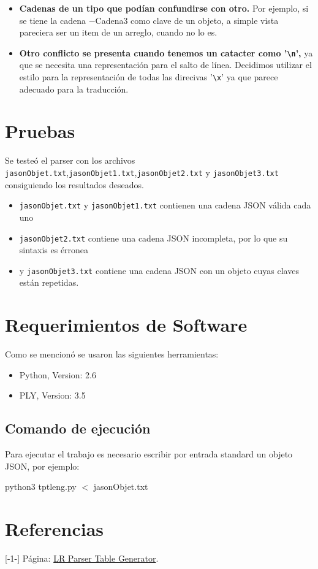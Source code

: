 \documentclass{article}
\begin{document}
\begin{itemize}
	\item \textbf{Cadenas de un tipo que podían confundirse con otro.} Por ejemplo, si se tiene la cadena $-$Cadena3 como clave de un objeto, a simple vista pareciera ser un item de un arreglo, cuando no lo es.
	\item \textbf{Otro conflicto se presenta cuando tenemos un catacter como '\texttt{\textbackslash n}',} ya que se necesita una representación para el salto de línea. Decidimos utilizar el estilo para la representación de todas las direcivas '\texttt{\textbackslash x}' ya que parece adecuado para la traducción.	
\end{itemize}

\section{Pruebas}

Se testeó el parser con los archivos \texttt{jasonObjet.txt},\texttt{jasonObjet1.txt},\texttt{jasonObjet2.txt} y \texttt{jasonObjet3.txt} consiguiendo los resultados deseados.
\begin{itemize}
\item \texttt{jasonObjet.txt} y \texttt{jasonObjet1.txt} contienen una cadena JSON válida cada uno
\item \texttt{jasonObjet2.txt} contiene una cadena JSON incompleta, por lo que su sintaxis es érronea
\item y \texttt{jasonObjet3.txt} contiene una cadena JSON con un objeto cuyas claves están repetidas.
\end{itemize}

\section{Requerimientos de Software}

Como se mencionó se usaron las siguientes herramientas:
\begin{itemize}
    \item Python, Version: 2.6
    \item PLY, Version: 3.5
\end{itemize}

\subsection{Comando de ejecución}
Para ejecutar el trabajo es necesario escribir por entrada standard un objeto JSON, por ejemplo:
\begin{center}
\begin{minipage}{0.8\textwidth}
	python3 tptleng.py $<$ jasonObjet.txt
\end{minipage}
\end{center}

\section{Referencias}
[-1-] Página:
\href{http://jsmachines.sourceforge.net/machines/lalr1.html}{LR Parser Table Generator}.
\end{document}
